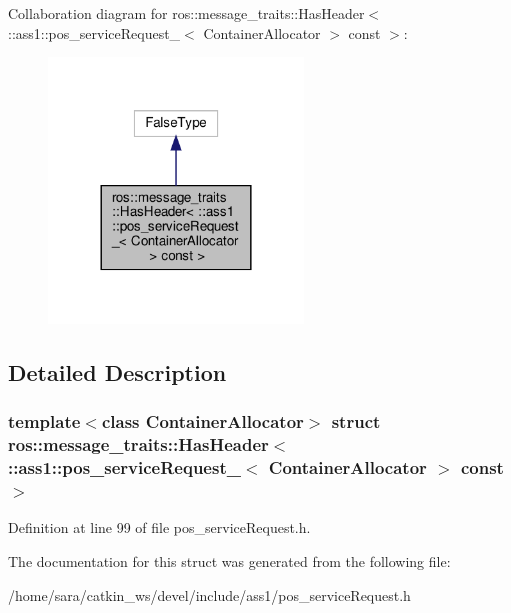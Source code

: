 Collaboration diagram for ros\+:\+:message\+\_\+traits\+:\+:Has\+Header$<$ \+:\+:ass1\+:\+:pos\+\_\+service\+Request\+\_\+$<$ Container\+Allocator $>$ const $>$\+:
\nopagebreak
\begin{figure}[H]
\begin{center}
\leavevmode
\includegraphics[width=192pt]{structros_1_1message__traits_1_1HasHeader_3_01_1_1ass1_1_1pos__serviceRequest___3_01ContainerAllf027905bdce434e8544c20c983a78b71}
\end{center}
\end{figure}


\subsection{Detailed Description}
\subsubsection*{template$<$class Container\+Allocator$>$\newline
struct ros\+::message\+\_\+traits\+::\+Has\+Header$<$ \+::ass1\+::pos\+\_\+service\+Request\+\_\+$<$ Container\+Allocator $>$ const $>$}



Definition at line 99 of file pos\+\_\+service\+Request.\+h.



The documentation for this struct was generated from the following file\+:\begin{DoxyCompactItemize}
\item 
/home/sara/catkin\+\_\+ws/devel/include/ass1/pos\+\_\+service\+Request.\+h\end{DoxyCompactItemize}
